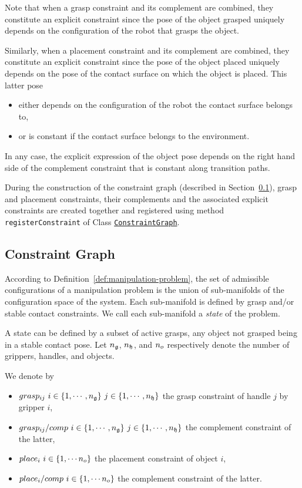 Note that when a grasp constraint and its complement are combined, they
constitute an explicit constraint since the pose of the object grasped
uniquely depends on the configuration of the robot that grasps the object.

Similarly, when a placement constraint and its complement are combined, they
constitute an explicit constraint since the pose of the object placed uniquely
depends on the pose of the contact surface on which the object is placed. This
latter pose
\begin{itemize}
\item either depends on the configuration of the robot the contact surface
  belongs to,
\item or is constant if the contact surface belongs to the environment.
\end{itemize}
In any case, the explicit expression of the object pose depends on the right
hand side of the complement constraint that is constant along transition paths.

During the construction of the constraint graph (described in Section~\ref{subsec:constraint graph}), grasp and placement
constraints, their complements and the associated explicit constraints
are created together and registered using method\\
\texttt{registerConstraint} of Class
\href{https://gepettoweb.laas.fr/hpp/hpp-manipulation/doxygen-html/classhpp_1_1manipulation_1_1graph_1_1Graph.html}{\texttt{ConstraintGraph}}.

\subsection{Constraint Graph}\label{subsec:constraint graph}

According to Definition~\ref{def:manipulation-problem}, the set of admissible configurations of a manipulation problem is the union of sub-manifolds of the configuration space of the system. Each sub-manifold is defined by grasp and/or stable contact constraints. We call each sub-manifold a \textit{state} of the problem.

A state can be defined by a subset of active grasps, any object not grasped being in a stable contact pose. Let $n_{\mathfrak{g}}$, $n_{\mathfrak{h}}$, and $n_{o}$ respectively denote the number of grippers, handles, and objects.

We denote by
\begin{itemize}
\item $grasp_{ij}\ i\in\{1,\cdots,\ngrippers\}\ j\in\{1,\cdots,\nhandles\}$ the grasp constraint of handle $j$ by gripper $i$,
\item $grasp_{ij}/comp\ i\in\{1,\cdots,\ngrippers\}\ j\in\{1,\cdots,\nhandles\}$ the complement constraint of the latter,
\item $place_{i}\ i\in\{1,\cdots\nobjects\}$ the placement constraint of object $i$,
\item $place_{i}/comp\ i\in\{1,\cdots\nobjects\}$ the complement constraint of the latter.
\end{itemize}


